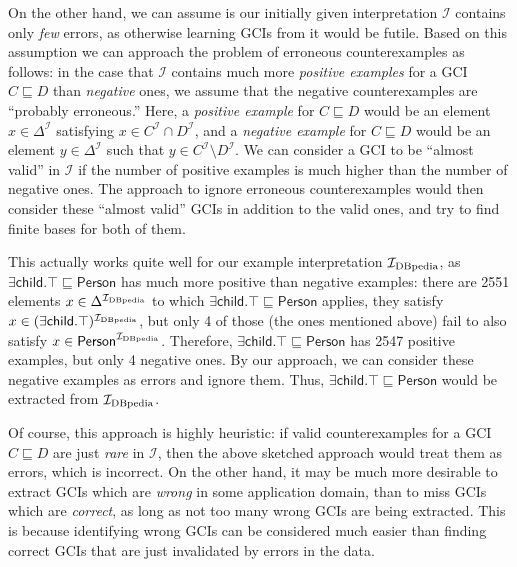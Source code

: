 On the other hand, we can assume is our initially given interpretation $\mathcal{I}$
contains only \emph{few} errors, as otherwise learning GCIs from it would be futile.
Based on this assumption we can approach the problem of erroneous counterexamples as
follows: in the case that $\mathcal{I}$ contains much more \emph{positive examples} for a
GCI $C \sqsubseteq D$ than \emph{negative} ones, we assume that the negative
counterexamples are \enquote{probably erroneous.}  Here, a \emph{positive example} for $C
\sqsubseteq D$ would be an element $x \in \Delta^{\mathcal{I}}$ satisfying $x \in
C^{\mathcal{I}} \cap D^{\mathcal{I}}$, and a \emph{negative example} for $C \sqsubseteq D$
would be an element $y \in \Delta^{\mathcal{I}}$ such that $y \in C^{\mathcal{I}}
\setminus D^{\mathcal{I}}$.  We can consider a GCI to be \enquote{almost valid} in
$\mathcal{I}$ if the number of positive examples is much higher than the number of
negative ones.  The approach to ignore erroneous counterexamples would then consider these
\enquote{almost valid} GCIs in addition to the valid ones, and try to find finite bases
for both of them.

This actually works quite well for our example interpretation ${\mathcal{I}_{\text{DBpedia}}}$, as
$\mathsf{\exists child. \top \sqsubseteq Person}$ has much more positive than negative
examples: there are 2551 elements $x \in \Delta^{{\mathcal{I}_{\text{DBpedia}}}}$ to which $\mathsf{\exists
  child. \top \sqsubseteq Person}$ applies, \ie they satisfy $x \in (\mathsf{\exists
  child. \top})^{{\mathcal{I}_{\text{DBpedia}}}}$, but only 4 of those (the ones mentioned above) fail to also
satisfy $x \in \mathsf{Person}^{{\mathcal{I}_{\text{DBpedia}}}}$.  Therefore, $\mathsf{\exists child. \top
  \sqsubseteq Person}$ has 2547 positive examples, but only 4 negative ones.  By our
approach, we can consider these negative examples as errors and ignore them.  Thus,
$\mathsf{\exists child. \top \sqsubseteq Person}$ would be extracted from ${\mathcal{I}_{\text{DBpedia}}}$.

Of course, this approach is highly heuristic: if valid counterexamples for a GCI $C
\sqsubseteq D$ are just \emph{rare} in $\mathcal{I}$, then the above sketched approach
would treat them as errors, which is incorrect.  On the other hand, it may be much more
desirable to extract GCIs which are \emph{wrong} in some application domain, than to miss
GCIs which are \emph{correct}, as long as not too many wrong GCIs are being extracted.
This is because identifying wrong GCIs can be considered much easier than finding correct
GCIs that are just invalidated by errors in the data.

